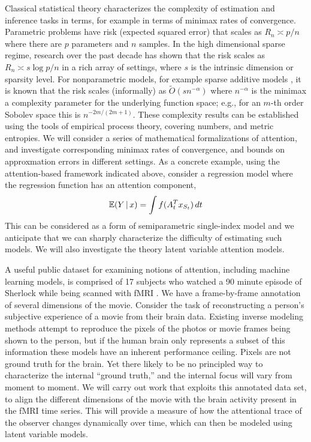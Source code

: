 Classical statistical theory characterizes the complexity of
estimation and inference tasks in terms, for example in terms of minimax rates of
convergence. Parametric problems have risk (expected squared error)
that scales as $R_n \asymp p/n$ where there are $p$ parameters and $n$
samples. In the high dimensional sparse regime, research over the past
decade has shown that the risk scales as $R_n \asymp s \log p/n$ 
in a rich array of settings, where $s$ is the intrinsic dimension or
sparsity level. For nonparametric models, for example sparse 
additive models \citep{Ravikumar:08}, it is known that the risk
scales (informally) as $\tilde O(s n^{-\alpha})$ where $n^{-\alpha}$ is 
the minimax a complexity parameter for the underlying function space;
e.g., for an $m$-th order Sobolev space this is
$n^{-2m/(2m+1)}$. These complexity results can be established using
the tools of empirical process theory, covering numbers, and metric
entropies. We will consider a series of mathematical formalizations
of attention, and investigate corresponding minimax rates of 
convergence, and bounds on approxmation errors in different settings.
As a concrete example, using the attention-based framework indicated
above, consider a regression model where the regression function 
has an attention component,
$$ \mbox{$\mathbb{E}$}(Y\,|\, x) = \int f(A_t^T x_{S_t}) \, dt$$
This can be considered as a form of semiparametric single-index model
\citep{horowitz09,horowitz96,ichimura93,kakade11,negahban12} 
and we anticipate that we can sharply characterize
the difficulty of estimating such models. We will also investigate
the theory latent variable attention models.

A useful public
dataset for examining notions of attention, including machine
learning models, is comprised of 17 subjects who watched a 90 minute
episode of Sherlock while being scanned with fMRI
\citep{chen17,baldassano17}. We have a
frame-by-frame annotation of several dimensions of the movie.
Consider the task of reconstructing a person's subjective experience
of a movie from their brain data. Existing inverse modeling methods
attempt to reproduce the pixels of the photos or movie frames being
shown to the person, but if the human brain only represents a subset
of this information these models have an inherent performance
ceiling. Pixels are not ground truth for the brain. Yet 
there likely to be no principled way to characterize the internal ``ground
truth,'' and the internal focus will vary from moment to moment. 
We will carry out work that exploits this annotated data set,
to align the different dimensions of the movie with the brain activity
present in the fMRI time series. This will provide a measure of
how the attentional trace of the observer changes dynamically over
time, which can then be modeled using latent variable models.




 
